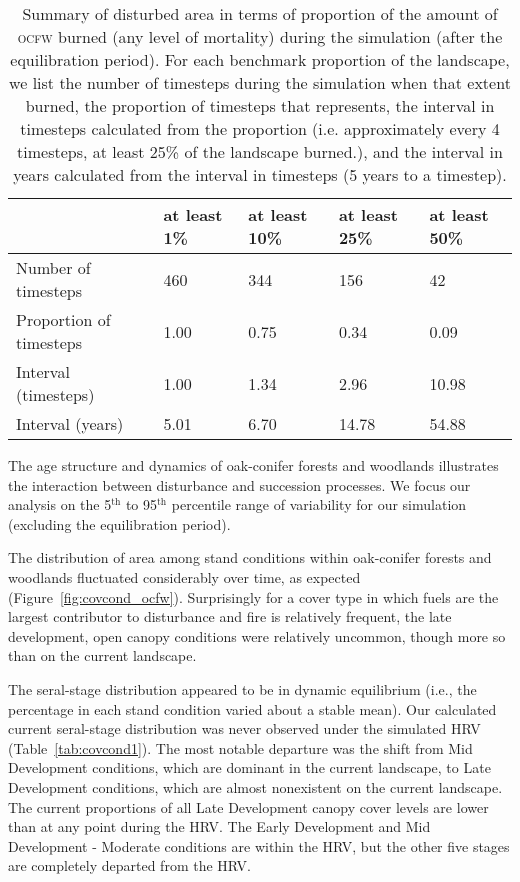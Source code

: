 \begin{table}[!htbp]
\small
\centering
\caption{Summary of disturbed area in terms of proportion of the amount of \textsc{ocfw} burned (any level of mortality) during the simulation (after the equilibration period). For each benchmark proportion of the landscape, we list the number of timesteps during the simulation when that extent burned, the proportion of timesteps that represents, the interval in timesteps calculated from the proportion (i.e. approximately every 4 timesteps, at least 25\% of the landscape burned.), and the interval in years calculated from the interval in timesteps (5 years to a timestep).}
\label{tab:darea_atleast_ocfw}
\begin{tabular}{@{}lllll@{}}
                        & at least 1\% & at least 10\% & at least 25\% & at least 50\% \\ \midrule
Number of timesteps     & 460          & 344           & 156           & 42           \\
Proportion of timesteps & 1.00         & 0.75          & 0.34          & 0.09         \\
Interval (timesteps)    & 1.00         & 1.34          & 2.96          & 10.98        \\
Interval (years)        & 5.01         & 6.70          & 14.78         & 54.88        \\ \bottomrule
\end{tabular}
\end{table}


The age structure and dynamics of oak-conifer forests and woodlands illustrates the interaction between disturbance and succession processes. We focus our analysis on the 5$^{\text{th}}$ to 95$^{\text{th}}$ percentile range of variability for our simulation (excluding the equilibration period). %

The distribution of area among stand conditions within oak-conifer forests and woodlands fluctuated considerably over time, as expected (Figure~\ref{fig:covcond_ocfw}). %
Surprisingly for a cover type in which fuels are the largest contributor to disturbance and fire is relatively frequent, the late development, open canopy conditions were relatively uncommon, though more so than on the current landscape.

The seral-stage distribution appeared to be in dynamic equilibrium (i.e., the percentage in each stand condition varied about a stable mean). Our calculated current seral-stage distribution was never observed under the simulated HRV (Table~\ref{tab:covcond1}). The most notable departure was the shift from Mid Development conditions, which are dominant in the current landscape, to Late Development conditions, which are almost nonexistent on the current landscape. The current proportions of all Late Development canopy cover levels are lower than at any point during the HRV.  The Early Development and Mid Development - Moderate conditions are within the HRV, but the other five stages are completely departed from the HRV.

